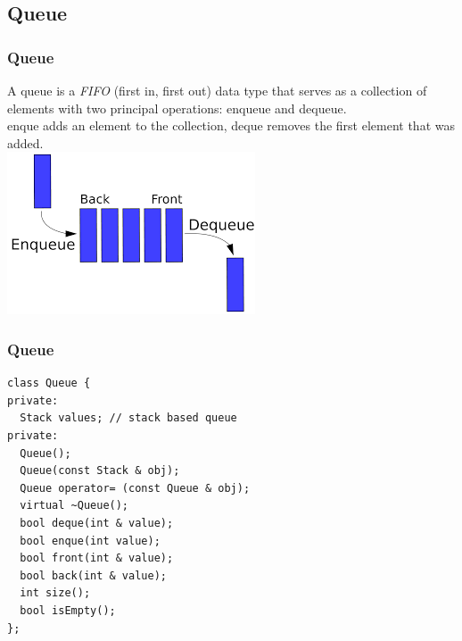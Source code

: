 \subsection{Queue}
\begin{frame}[fragile]
\frametitle{Queue}
A queue is a \emph{FIFO} (first in, first out) data type that serves as a collection
of elements with two principal operations: enqueue and dequeue.\\
enque adds an element to the collection, deque removes the first element that was added.\\
\vspace{1mm}
\includegraphics[scale=0.3]{img/queue.png}
\end{frame}

\begin{frame}[fragile]
\frametitle{Queue}
{\tiny
\begin{lstlisting}
class Queue {
private:
  Stack values; // stack based queue
private:
  Queue();
  Queue(const Stack & obj);
  Queue operator= (const Queue & obj);
  virtual ~Queue();
  bool deque(int & value);
  bool enque(int value);
  bool front(int & value);
  bool back(int & value);
  int size();
  bool isEmpty();
};
\end{lstlisting}
}
\end{frame}